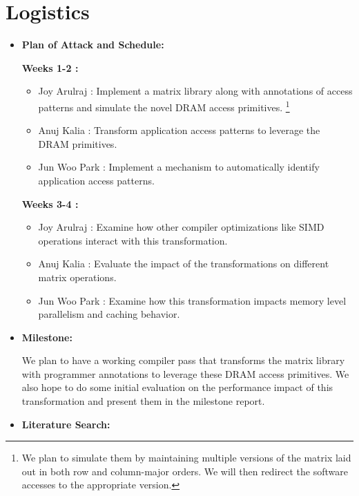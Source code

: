\documentclass[letterpaper]{article}
\begin{document}
\section{Logistics}

\begin{itemize}

\item \textbf{Plan of Attack and Schedule:}

\textbf{Weeks 1-2 :}

\begin{itemize}
\item Joy Arulraj : Implement a matrix library along with annotations of access
patterns and simulate the novel DRAM access primitives. \footnote{We plan to
simulate them by maintaining multiple versions of the matrix laid out in both row
and column-major orders. We will then redirect the software accesses to
the appropriate version.}

\item Anuj Kalia : Transform application access patterns to leverage the DRAM
primitives.

\item Jun Woo Park : Implement a mechanism to automatically identify application
access patterns.
\end{itemize}

\textbf{Weeks 3-4 :}

\begin{itemize}
\item Joy Arulraj : Examine how other compiler optimizations like SIMD
operations interact with this transformation.

\item Anuj Kalia : Evaluate the impact of the transformations on different
matrix operations.

\item Jun Woo Park : Examine how this transformation impacts memory level
parallelism and caching behavior.
\end{itemize}


\item \textbf{Milestone:} 

We plan to have a working compiler pass that transforms the matrix library 
with programmer annotations to leverage these DRAM access primitives.
We also hope to do some initial evaluation on the performance impact
of this transformation and present them in the milestone report.

\item \textbf{Literature Search:}  


\end{itemize}
\end{document}
